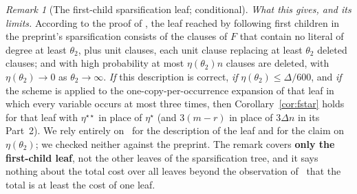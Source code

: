 \documentclass[11pt,a4paper]{article}
\theoremstyle{definition}
\theoremstyle{remark}
\newtheorem{remark}[theorem]{Remark}
\begin{document}
\begin{remark}[The first-child sparsification leaf; conditional]
\emph{What this gives, and its limits.} According to the proof of
\cite[Theorem~8.3(b)]{DL}, the leaf reached by following first children in the preprint's
sparsification consists of the clauses of $F$ that contain no literal of degree at least
$\theta_2$, plus unit clauses, each unit clause replacing at least $\theta_2$ deleted
clauses; and with high probability at most $\eta(\theta_2)n$ clauses are deleted, with
$\eta(\theta_2)\to0$ as $\theta_2\to\infty$. \emph{If} this description is correct,
\emph{if} $\eta(\theta_2)\le\Delta/600$, and \emph{if} the scheme is applied to the
one-copy-per-occurrence expansion of that leaf in which every variable occurs at most three
times, then Corollary~\ref{cor:fstar} holds for that leaf with $\eta^{\star\star}$ in place
of $\eta^\star$ (and $3(m-r)$ in place of $3\Delta n$ in its Part~2). We rely entirely on~\cite{DL} for the description of the leaf and for the
claim on $\eta(\theta_2)$; we checked neither against the preprint. The remark covers
\textbf{only the first-child leaf}, not the other leaves of the sparsification tree, and it
says nothing about the total cost over all leaves beyond the observation of~\cite{DL} that
the total is at least the cost of one leaf.
\end{remark}
\end{document}
